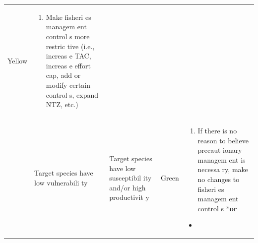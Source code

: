 \documentclass[]{book}
\providecommand{\tightlist}{%
  \setlength{\itemsep}{0pt}\setlength{\parskip}{0pt}}
\begin{document}
\begin{longtable}[]{@{}lllll@{}}
\begin{minipage}[t]{0.19\columnwidth}
Yellow\strut
\end{minipage} & \begin{minipage}[t]{0.19\columnwidth}\raggedright\strut
\begin{enumerate}
\def\labelenumi{\arabic{enumi}.}
\tightlist
\item
  Make fisheri es managem ent control s more restric tive (i.e., increas
  e TAC, increas e effort cap, add or modify certain control s, expand
  NTZ, etc.)
\end{enumerate}\strut
\end{minipage}\tabularnewline
\begin{minipage}[t]{0.19\columnwidth}\raggedright\strut
\strut
\end{minipage} & \begin{minipage}[t]{0.19\columnwidth}\raggedright\strut
Target species have low vulnerabili ty\strut
\end{minipage} & \begin{minipage}[t]{0.19\columnwidth}\raggedright\strut
Target species have low susceptibil ity and/or high productivit y\strut
\end{minipage} & \begin{minipage}[t]{0.19\columnwidth}\raggedright\strut
Green\strut
\end{minipage} & \begin{minipage}[t]{0.19\columnwidth}\raggedright\strut
\begin{enumerate}
\def\labelenumi{\arabic{enumi}.}
\tightlist
\item
  If there is no reason to believe precaut ionary managem ent is necessa
  ry, make no changes to fisheri es managem ent control s *\textbf{or}
\end{enumerate}

\begin{itemize}
\item
\end{itemize}


\end{minipage}
\end{longtable}
\end{document}
